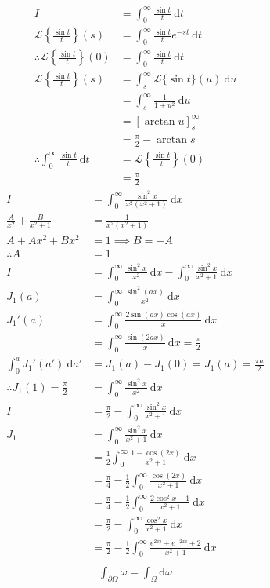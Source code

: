 \documentclass[a4paper,11pt]{article}
\theoremstyle{plain}
\theoremstyle{definition}
\newcommand{\cL}{\mathcal{L}}
\newcommand{\dx}{\text{d}}
\newcommand{\del}{\partial}
\begin{document}
\newline
\begin{align*}
	I&=\int_0^\infty \frac{\sin t}{t}\ \dx t\\
	\cL\left\{\frac{\sin t}{t}\right\}(s)
	&=\int_0^\infty\frac{\sin t}{t}e^{-st}\ \dx t \\
	\therefore \cL\left\{\frac{\sin t}{t}\right\}(0)
	&=\int_0^\infty\frac{\sin t}{t}\ \dx t \\
	\cL\left\{\frac{\sin t}{t}\right\}(s)
	&=\int_s^\infty\cL\{\sin t\}(u)\ \dx u \\
	&=\int_s^\infty\frac{1}{1+u^2}\ \dx u \\
	&={\left[\arctan u\right]}_s^\infty \\
	&=\frac{\pi}{2}-\arctan s \\
	\therefore \int_0^\infty\frac{\sin t}{t}\ \dx t
	&=\cL\left\{\frac{\sin t}{t}\right\}(0)\\
	&=\frac{\pi}{2}
\end{align*}
\newline
\begin{align*}
	I&=\int_0^\infty \frac{\sin^2 x}{x^2(x^2+1)}\ \dx x\\
	\frac{A}{x^2}+\frac{B}{x^2+1}&=\frac{1}{x^2(x^2+1)}\\
	A+Ax^2+Bx^2&=1\implies B=-A\\
	\therefore A&=1\\
	I&=\int_0^\infty \frac{\sin^2 x}{x^2}\ \dx x
	-\int_0^\infty \frac{\sin^2 x}{x^2+1}\ \dx x\\
	J_1(a)&=\int_0^\infty \frac{\sin^2 (ax)}{x^2}\ \dx x\\
	J_1'(a)&=\int_0^\infty \frac{2\sin(ax)\cos(ax)}{x}\ \dx x\\
		   &=\int_0^\infty \frac{\sin(2ax)}{x}\ \dx x=\frac{\pi}{2}\\
	\int_0^a J_1'(a')\ \dx a'&=J_1(a)-J_1(0)=J_1(a)=\frac{\pi a}{2}\\
	\therefore J_1(1)=\frac{\pi}{2}&=\int_0^\infty\frac{\sin^2x}{x^2}\ \dx x\\
	I&=\frac{\pi}{2}
	-\int_0^\infty \frac{\sin^2 x}{x^2+1}\ \dx x\\
	J_1&=\int_0^\infty \frac{\sin^2 x}{x^2+1}\ \dx x\\
	&=\frac{1}{2}\int_0^\infty \frac{1-\cos (2x)}{x^2+1}\ \dx x\\
	&=\frac{\pi}{4}-\frac{1}{2}\int_0^\infty \frac{\cos (2x)}{x^2+1}\ \dx x\\
	&=\frac{\pi}{4}-\frac{1}{2}\int_0^\infty \frac{2\cos^2 x-1}{x^2+1}\ \dx x\\
	&=\frac{\pi}{2}-\int_0^\infty \frac{\cos^2 x}{x^2+1}\ \dx x\\
	&=\frac{\pi}{2}-\frac{1}{2}\int_0^\infty \frac{e^{2xi}+e^{-2xi}+2}{x^2+1}\ \dx x\\
\end{align*}
\begin{align*}
	\int_{\del \Omega} \omega = \int_{\Omega} \dx \omega
\end{align*}
\newpage
\end{document}
